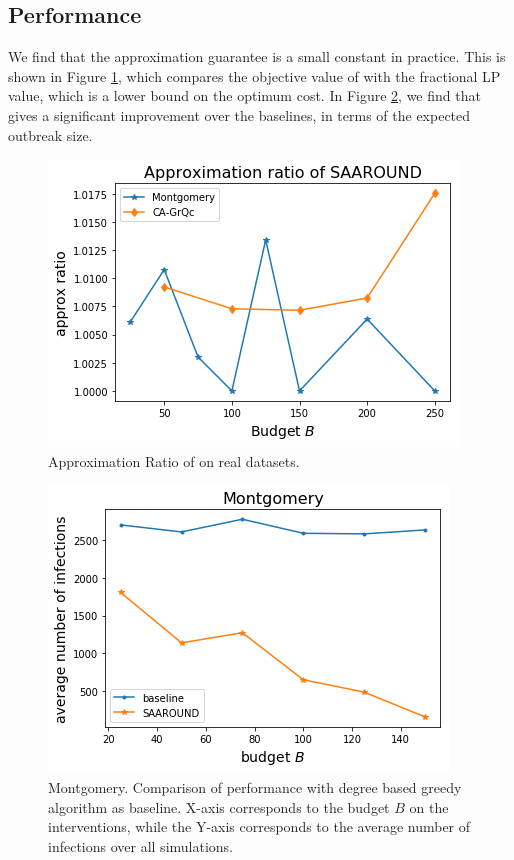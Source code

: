 \subsection{Performance}
We find that the approximation guarantee is a small constant in practice. This is shown in Figure \ref{fig:approx}, which compares the objective value of \algo{} with the fractional LP value, which is a lower bound on the optimum cost. In Figure \ref{fig:baseline}, we find that \algo{} gives a significant improvement over the baselines, in terms of the expected outbreak size.
\begin{figure}[!h]
    \centering
    \includegraphics[scale = 0.35]{figures/approx.png}
    \caption{Approximation Ratio of \algo{} on real datasets.}
    \label{fig:approx}
\end{figure}
 

\begin{figure}[!h]
    \centering
    \includegraphics[scale = 0.5]{figures/baslinecomp.png}
    \caption{Montgomery. Comparison of \algo{} performance with degree based greedy algorithm as baseline. X-axis corresponds to the budget $B$ on the interventions, while the Y-axis corresponds to the average number of infections over all simulations. 
    }
    \label{fig:baseline}
\end{figure}
 
